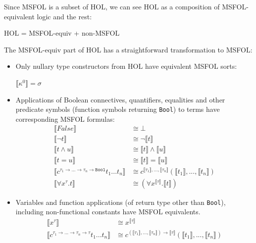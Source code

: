 \documentclass[11pt]{article}
\begin{document}
	Since MSFOL is a subset of 
	HOL, we can see HOL as a 
	composition of 
	MSFOL-equivalent logic 
	and the rest:
	\begin{center}
		HOL = MSFOL-equiv + non-MSFOL 
	\end{center}
	The MSFOL-equiv part of HOL has 
	a straightforward transformation 
	to MSFOL:
	\begin{itemize}
		\item Only nullary type 
		constructors from HOL have
		equivalent MSFOL sorts:
		\begin{center}
			$\llbracket \kappa^{0} 
			\rrbracket = \sigma $
		\end{center}
		\item Applications of 
		Boolean connectives,
		quantifiers, equalities and 
		other predicate symbols (function symbols 
		returning \texttt{Bool}) to 
		terms have corresponding 
		MSFOL formulas:
		\begin{align*}
		\llbracket False 
		\rrbracket &\cong \bot \\
		\llbracket \neg t \rrbracket 
		&\cong \neg \llbracket t 
		\rrbracket\\
		\llbracket t \land u 
		\rrbracket &\cong \llbracket t 
		\rrbracket \land \llbracket u
		\rrbracket\\
		\llbracket t = u \rrbracket 
		&\cong \llbracket t 
		\rrbracket = \llbracket u
		\rrbracket\\
		\llbracket c^{\tau_1 \to ... 
			\to \tau_n \to \texttt{Bool}} 
		t_1 ... t_n \rrbracket &\cong 
		c^{\llbracket \tau_1 \rrbracket, 
			..., \llbracket \tau_n \rrbracket}
		(\llbracket t_1 \rrbracket, ..., 
		\llbracket t_n \rrbracket)\\
		\llbracket \forall x^{\tau}.t 
		\rrbracket &\cong (\forall 
		x^{\llbracket \tau \rrbracket}.
		\llbracket t \rrbracket)
		\end{align*}
		\item Variables and function 
		applications (of return type 
		other than \texttt{Bool}), 
		including non-functional 
		constants have MSFOL 
		equivalents.
		\begin{align*}
		\llbracket x^{\tau} 
		\rrbracket &\cong 
		x^{\llbracket \tau \rrbracket}\\
		\llbracket c^{\tau_1 \to ... 
			\to \tau_n \to \tau} 
		t_1 ... t_n \rrbracket &\cong 
		c^{(\llbracket \tau_1 \rrbracket, 
			..., \llbracket \tau_n \rrbracket)
			\to \llbracket \tau \rrbracket}
		(\llbracket t_1 \rrbracket, ..., 
		\llbracket t_n \rrbracket)
		\end{align*}
	\end{itemize}
	
\end{document}
